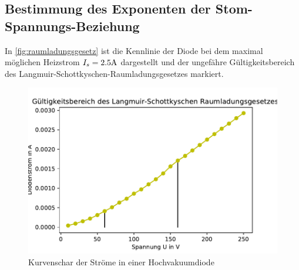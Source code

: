   \subsection{Bestimmung des Exponenten der Stom-Spannungs-Beziehung}
  \label{sec:exponent}
  In \autoref{fig:raumladungsgesetz} ist die Kennlinie der Diode bei dem maximal möglichen Heizstrom 
  $I_s=2.5\si[]{A}$ dargestellt und der ungefähre Gültigkeitsbereich des Langmuir-Schottkyschen-Raumladungsgesetzes
  markiert.
  \begin{figure}
    \centering
    \includegraphics{raumladungsgesetz.pdf}
    \caption{Kurvenschar der Ströme in einer Hochvakuumdiode}
    \label{fig:raumladungsgesetz}
  \end{figure}
  